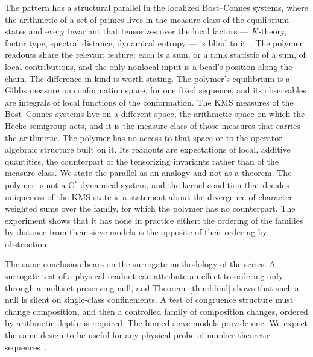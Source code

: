 \documentclass[reprint,amsmath,amssymb,aps,pre,longbibliography]{revtex4-2}
\begin{document}
The pattern has a structural parallel in the localized Bost--Connes systems, where the arithmetic
of a set of primes lives in the measure class of the equilibrium states and every invariant that
tensorizes over the local factors --- $K$-theory, factor type, spectral distance, dynamical
entropy --- is blind to it~\cite[Ch.~4]{LBCS}. The polymer readouts share the relevant feature:
each is a sum, or a rank statistic of a sum, of local contributions, and the only nonlocal input
is a bead's position along the chain. The difference in kind is worth stating. The polymer's
equilibrium is a Gibbs measure on conformation space, for one fixed sequence, and its observables
are integrals of local functions of the conformation. The KMS measures of the Bost--Connes
systems live on a different space, the arithmetic space on which the Hecke semigroup acts, and
it is the measure class of those measures that carries the arithmetic. The polymer has no access
to that space or to the operator-algebraic structure built on it. Its readouts are expectations of
local, additive quantities, the counterpart of the tensorizing invariants rather than of the
measure class. We state the parallel as an analogy and not as a theorem.
The polymer is not a C$^*$-dynamical system, and the kernel condition that decides uniqueness of
the KMS state is a statement about the divergence of character-weighted sums over the family,
for which the polymer has no counterpart. The experiment shows that it has none in practice
either: the ordering of the families by distance from their sieve models is the opposite of
their ordering by obstruction.

The same conclusion bears on the surrogate methodology of the series. A surrogate test of a
physical readout can attribute an effect to ordering only through a multiset-preserving null,
and Theorem~\ref{thm:blind} shows that such a null is silent on single-class confinements. A test
of congruence structure must change composition, and then a controlled family of composition
changes, ordered by arithmetic depth, is required. The binned sieve models provide one. We
expect the same design to be useful for any physical probe of number-theoretic
sequences~\cite{Odijk,KhokhlovKhalatur}.
\end{document}
